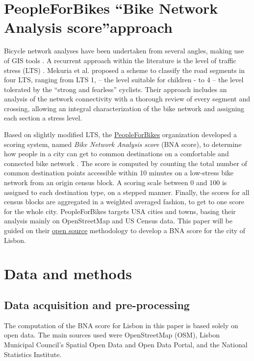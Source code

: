 \documentclass[information,article,submit,moreauthors,pdftex,10pt,a4paper]{mdpi}
\theoremstyle{mdpi}
\newcounter{ex}
\newcounter{re}
\theoremstyle{mdpidefinition}
\begin{document}
\section{PeopleForBikes \textquotedblleft Bike Network Analysis score\textquotedblright approach} \label{pfb}

Bicycle network analyses have been undertaken from several angles, making use of GIS tools \cite{Manum2013,Cooper2017}. A recurrent approach within the literature is the level of traffic stress (LTS) \cite{Sorton1994,Geller2006}. Mekuria et al. \cite{Mekuria2012} proposed a scheme to classify the road segments in four LTS, ranging from LTS 1, – the level suitable for children - to 4 – the level tolerated by the “strong and fearless” cyclists. Their approach includes an analysis of the network connectivity with a thorough review of every segment and crossing, allowing an integral characterization of the bike network and assigning each section a stress level. 

Based on slightly modified LTS, the \href{https://peopleforbikes.org/}{PeopleForBikes} organization developed a scoring system, named \textit{Bike Network Analysis score} (BNA score), to determine how people in a city can get to common destinations on a comfortable and connected bike network \cite{PeopleforBikes2014}. The score is computed by counting the total number of common destination points accessible within 10 minutes on a low-stress bike network from an origin census block. A scoring scale between 0 and 100 is assigned to each destination type, on a stepped manner. Finally, the scores for all census blocks are aggregated in a weighted averaged fashion, to get to one score for the whole city. PeopleForBikes targets USA cities and towns, basing their analysis mainly on OpenStreetMap and US Census data. This paper will be guided on their \href{https://github.com/azavea/pfb-network-connectivity}{open source} methodology to develop a BNA score for the city of Lisbon.

\section{Data and methods} \label {methods}

\subsection{Data acquisition and pre-processing} \label{data}

The computation of the BNA score for Lisbon in this paper is based solely on open data. The main sources used were OpenStreetMap (OSM), Lisbon Municipal Council's Spatial Open Data and Open Data Portal, and the National Statistics Institute. 
\end{document}
